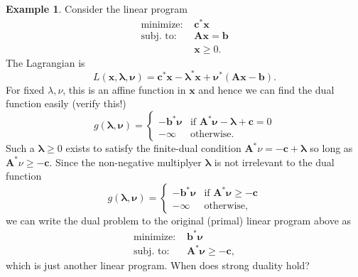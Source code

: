 \documentclass[10pt,letterpaper]{article}
\theoremstyle{definition}
\newtheorem{example}[theorem]{Example}
\theoremstyle{remark}
\newcommand\A{\boldsymbol{A}}
\newcommand\x{\boldsymbol{x}}
\newcommand\lambdab{\boldsymbol{\lambda}}
\newcommand\nub{\boldsymbol{\nu}}
\renewcommand\c{\boldsymbol{c}}
\renewcommand\b{\boldsymbol{b}}
\begin{document}
\begin{example}
    Consider the linear program
    \begin{align*}
        \text{minimize: } & \c^*\x\\
        \text{subj. to: } & \A\x = \b\\
                          & \x \geq 0.
    \end{align*}
    The Lagrangian is
    \[
        L(\x,\lambdab,\nub) = \c^*\x - \lambdab^*\x + \nub^*(\A\x - \b).
    \]
    For fixed $\lambda,\nu$, this is an affine function in $\x$ and hence we can find
    the dual function easily (verify this!)
    \[
        g(\lambdab,\nub) = \begin{cases}
            -\b^*\nub & \text{if } \A^*\nub - \lambdab + \c = 0\\
            -\infty   & \text{otherwise.}
        \end{cases}
    \]
    Such a $\lambdab\geq 0$ exists to satisfy the finite-dual condition
    $\A^*\nu = -\c + \lambdab$ so long as $\A^*\nu \geq -\c$. Since the non-negative
    multiplyer $\lambdab$ is not irrelevant to the dual function
    \[
        g(\lambdab,\nub) = \begin{cases}
            -\b^*\nub & \text{if }\A^*\nub \geq -\c\\
            -\infty &\text{otherwise,}
        \end{cases}
    \]
    we can write the dual problem to the original (primal) linear program above
    as
    \begin{align*}
        \text{minimize: } & \b^*\nub\\
        \text{subj. to: } & \A^*\nub \geq -\c,
    \end{align*}
    which is just another linear program. When does strong duality hold?
\end{example}
\end{document}
